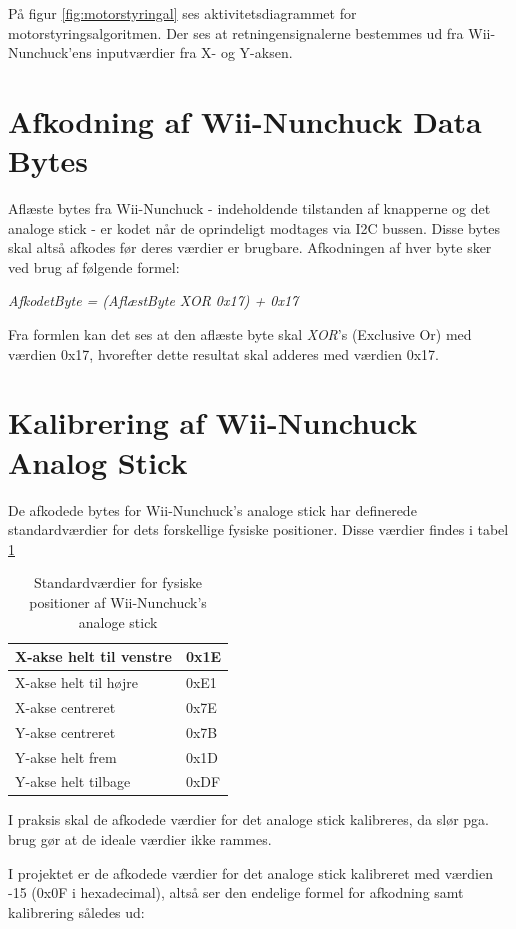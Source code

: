 \noindent På figur \ref{fig:motorstyringal} ses aktivitetsdiagrammet for motorstyringsalgoritmen. Der ses at retningensignalerne bestemmes ud fra Wii-Nunchuck'ens inputværdier fra X- og Y-aksen.

\section{Afkodning af Wii-Nunchuck Data Bytes}
Aflæste bytes fra Wii-Nunchuck - indeholdende tilstanden af knapperne og det analoge stick - er kodet når de oprindeligt modtages via I2C bussen. Disse bytes skal altså afkodes før deres værdier er brugbare. Afkodningen af hver byte sker ved brug af følgende formel:

\textit{AfkodetByte = (AflæstByte XOR 0x17) + 0x17}

Fra formlen kan det ses at den aflæste byte skal \textit{XOR}'s (Exclusive Or) med værdien 0x17, hvorefter dette resultat skal adderes med værdien 0x17.

\section{Kalibrering af Wii-Nunchuck Analog Stick}
De afkodede bytes for Wii-Nunchuck's analoge stick har definerede standardværdier for dets forskellige fysiske positioner. Disse værdier findes i tabel \ref{tabel:WiiNunchuckStickPositioner}

\begin{table}[H]
	\centering
	\begin{tabular}{|l|l|}
		\hline
		X-akse helt til venstre & 0x1E \\ \hline
		X-akse helt til højre   & 0xE1 \\ \hline
		X-akse centreret        & 0x7E \\ \hline
		Y-akse centreret        & 0x7B \\ \hline
		Y-akse helt frem        & 0x1D \\ \hline
		Y-akse helt tilbage     & 0xDF \\ \hline
	\end{tabular}
	\caption{Standardværdier for fysiske positioner af Wii-Nunchuck's analoge stick}
	\label{tabel:WiiNunchuckStickPositioner}
\end{table}

I praksis skal de afkodede værdier for det analoge stick kalibreres, da slør pga. brug gør at de ideale værdier ikke rammes. 

I projektet er de afkodede værdier for det analoge stick kalibreret med værdien -15 (0x0F i hexadecimal), altså ser den endelige formel for afkodning samt kalibrering således ud:

